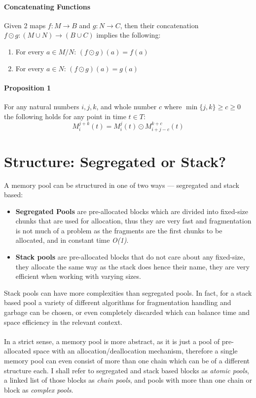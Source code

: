 \documentclass[a4paper, 12pt]{article}
\begin{document}
\paragraph{Concatenating Functions}
Given 2 maps \(f: M \rightarrow B\) and \(g: N \rightarrow C\), then their concatenation \(f \odot g: (M \cup N) \rightarrow (B \cup C)\) implies the following:
\begin{enumerate}
    \item For every \(a \in M/ N\): \((f \odot g)(a) = f(a)\)
    \item For every \(a \in N\): \((f \odot g)(a) = g(a)\)
\end{enumerate}

\paragraph{Proposition 1}
For any natural numbers \(i, j, k\), and whole number \(c\) where \(\min\{j, k\} \geq c \geq 0\) the following holds for any point in time \(t \in T\):
\begin{equation*}
    M_i^{j + k}(t) = M_i^j(t) \odot M_{i + j - c}^{k + c}(t)
\end{equation*}

\section{Structure: Segregated or Stack?}
A memory pool can be structured in one of two ways --- segregated and stack based:
\begin{itemize}
    \item \textbf{Segregated Pools} are pre-allocated blocks which are divided into fixed-size chunks that are used for allocation, thus they are very fast and fragmentation is not much of a problem as the fragments are the first chunks to be allocated, and in constant time \textit{O(1)}.
    \item \textbf{Stack pools} are pre-allocated blocks that do not care about any fixed-size, they allocate the same way as the stack does hence their name, they are very efficient when working with varying sizes.
\end{itemize}
Stack pools can have more complexities than segregated pools.
In fact, for a stack based pool a variety of different algorithms for fragmentation handling and garbage can be chosen, or even completely discarded which can balance time and space efficiency in the relevant context.

\paragraph{}
In a strict sense, a memory pool is more abstract, as it is just a pool of pre-allocated space with an allocation/deallocation mechanism, therefore a single memory pool can even consist of more than one chain which can be of a different structure each.
I shall refer to segregated and stack based blocks as \textit{atomic pools}, a linked list of those blocks as \textit{chain pools}, and pools with more than one chain or block as \textit{complex pools}.
\end{document}
